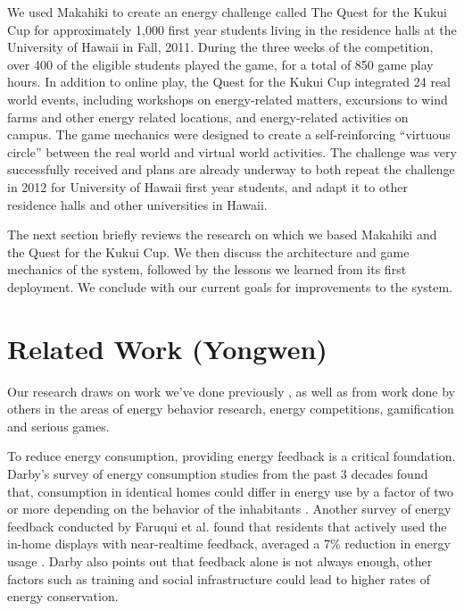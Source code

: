 \documentclass{acm_proc_article-sp}
\begin{document}
We used Makahiki to create an energy challenge called The Quest for the
Kukui Cup for approximately 1,000 first year students living in the
residence halls at the University of Hawaii in Fall, 2011.  During the
three weeks of the competition, over 400 of the eligible students played
the game, for a total of 850 game play hours.  In addition to online play,
the Quest for the Kukui Cup integrated 24 real world events, including
workshops on energy-related matters, excursions to wind farms and other
energy related locations, and energy-related activities on campus. The game
mechanics were designed to create a self-reinforcing ``virtuous circle''
between the real world and virtual world activities.  The challenge was
very successfully received and plans are already underway to both repeat
the challenge in 2012 for University of Hawaii first year students, and 
adapt it to other residence halls and other universities in Hawaii.

The next section briefly reviews the research on which we based Makahiki
and the Quest for the Kukui Cup.   We then discuss the architecture and
game mechanics of the system, followed by the lessons we learned from its
first deployment. We conclude with our current goals for improvements to
the system.

\section{Related Work (Yongwen)}
Our research draws on work we've done previously
\cite{csdl2-11-03,csdl2-10-05,csdl2-10-07,csdl2-11-02}, as well as from
work done by others in the areas of energy behavior research, energy 
competitions, gamification and serious games. 

To reduce energy consumption, providing energy feedback is a critical 
foundation. Darby's survey of energy consumption studies from the past 3 
decades found  that, consumption in identical homes could differ in energy use 
by a factor of two or more depending on the behavior of the inhabitants
\cite{darby-review-2006}. Another survey of energy feedback conducted by 
Faruqui et al. found that residents that actively used the in-home displays 
with near-realtime feedback, averaged a 7\% reduction in energy usage
\cite{Faruqui09}. Darby also points out that feedback alone is not always 
enough, other factors such as training and social infrastructure could lead to 
higher rates of energy conservation\cite{darby-2000-making-it-obvious}.
\end{document}
